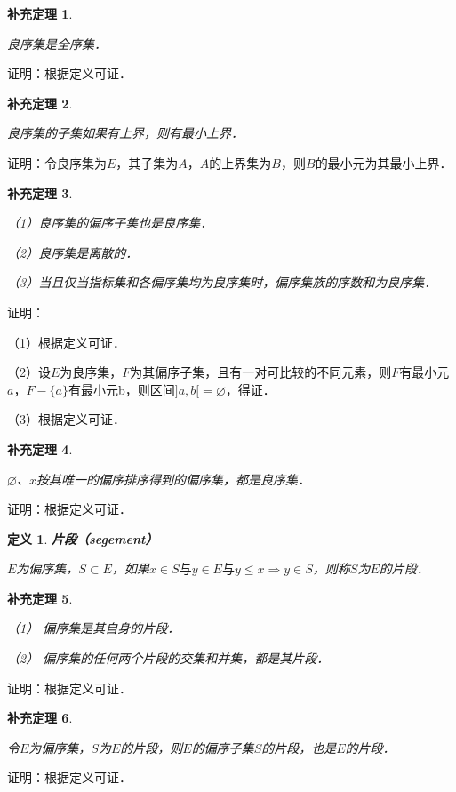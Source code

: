 \documentclass[12pt, a4paper, oneside]{book}
\newtheorem{cor}{补充定理}
\newtheorem{de}{定义}
\begin{document}
			\begin{cor}\label{cor215}
				\hfill\par
				良序集是全序集．
			\end{cor}
			证明：根据定义可证．
			
			\begin{cor}\label{cor216}
				\hfill\par
				良序集的子集如果有上界，则有最小上界．
			\end{cor}
			证明：令良序集为$E$，其子集为$A$，$A$的上界集为$B$，则$B$的最小元为其最小上界．
			
			\begin{cor}\label{cor217}
				\hfill\par
				（1）良序集的偏序子集也是良序集．	
				\par
				（2）良序集是离散的．
				\par
				（3）当且仅当指标集和各偏序集均为良序集时，偏序集族的序数和为良序集．
			\end{cor}
			证明：
			\par
			（1）根据定义可证．
			\par
			（2）设$E$为良序集，$F$为其偏序子集，且有一对可比较的不同元素，则$F$有最小元$a$，$F-\{a\}$有最小元b，则区间$]a, b[=\varnothing$，得证．
			\par
			（3）根据定义可证．
			
			\begin{cor}\label{cor218}
				\hfill\par
				$\varnothing$、${x}$按其唯一的偏序排序得到的偏序集，都是良序集．
			\end{cor}
			证明：根据定义可证．

			\begin{de}
				\textbf{片段（segement）}
				\par
				$E$为偏序集，$S\subset E$，如果$x\in S\text{与}y\in E\text{与}y\leq x\Rightarrow y\in S$，则称$S$为$E$的片段．
			\end{de}
						
			\begin{cor}\label{cor219}
				\hfill\par
				（1）	偏序集是其自身的片段．
				\par
				（2）	偏序集的任何两个片段的交集和并集，都是其片段．
			\end{cor}
			证明：根据定义可证．
			
			\begin{cor}\label{cor220}
				\hfill\par
				令$E$为偏序集，$S$为$E$的片段，则$E$的偏序子集$S$的片段，也是$E$的片段．
			\end{cor}
			证明：根据定义可证．
			
\end{document}
